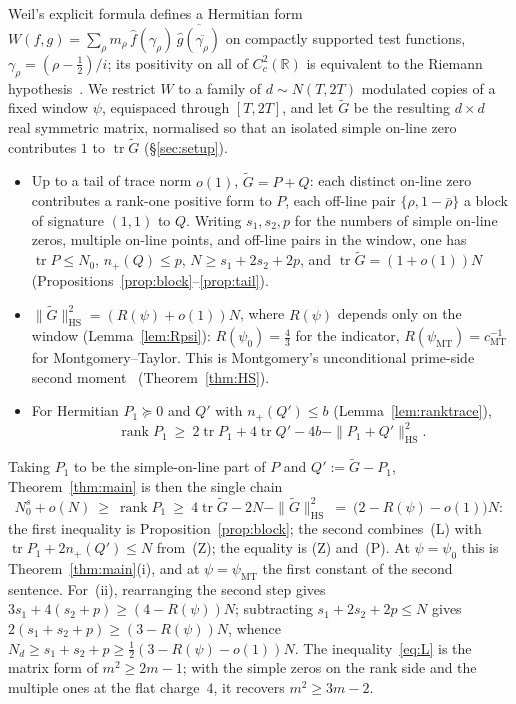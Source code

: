 \documentclass[11pt]{amsart}
\theoremstyle{definition}
\theoremstyle{remark}
\numberwithin{equation}{section}
\DeclareMathOperator{\tr}{tr}
\DeclareMathOperator{\rank}{rank}
\newcommand{\RR}{\mathbb{R}}
\newcommand{\wh}{\widehat}
\newcommand{\ol}{\overline}
\newcommand{\Gt}{\widetilde{G}}
\newcommand{\npl}{n_{+}}
\newcommand{\HS}{\mathrm{HS}}
\begin{document}
Weil's explicit formula defines a Hermitian form $W(f,g)=\sum_\rho m_\rho\,\wh f(\gamma_\rho)\,\ol{\wh g(\ol{\gamma_\rho})}$ on compactly supported test functions, $\gamma_\rho=(\rho-\tfrac12)/i$; its positivity on all of $C_c^2(\RR)$ is equivalent to the Riemann hypothesis~\cite{Wei52,Bom00}. We restrict $W$ to a family of $d\sim N(T,2T)$ modulated copies of a fixed window $\psi$, equispaced through $[T,2T]$, and let $\Gt$ be the resulting $d\times d$ real symmetric matrix, normalised so that an isolated simple on-line zero contributes $1$ to $\tr\Gt$ (\S\ref{sec:setup}).
\begin{itemize}
\item[(Z)] Up to a tail of trace norm $o(1)$, $\Gt=P+Q$: each distinct on-line zero contributes a rank-one positive form to $P$, each off-line pair $\{\rho,1-\bar\rho\}$ a block of signature $(1,1)$ to $Q$. Writing $s_1,s_2,p$ for the numbers of simple on-line zeros, multiple on-line points, and off-line pairs in the window, one has $\tr P\le N_0$, $\npl(Q)\le p$, $N\ge s_1+2s_2+2p$, and $\tr\Gt=(1+o(1))N$ (Propositions~\ref{prop:block}--\ref{prop:tail}).
\item[(P)] $\|\Gt\|_{\HS}^2=(R(\psi)+o(1))N$, where $R(\psi)$ depends only on the window (Lemma~\ref{lem:Rpsi}): $R(\psi_0)=\tfrac43$ for the indicator, $R(\psi_{\mathrm{MT}})=c_{\mathrm{MT}}^{-1}$ for Montgomery--Taylor. This is Montgomery's unconditional prime-side second moment~\cite{Mon73,Ary22,BGSTB24} (Theorem~\ref{thm:HS}).
\item[(L)] For Hermitian $P_1\succeq0$ and $Q'$ with $\npl(Q')\le b$ (Lemma~\ref{lem:ranktrace}),
\begin{equation}\label{eq:L}
\rank P_1\ \ge\ 2\tr P_1+4\tr Q'-4b-\|P_1+Q'\|_{\HS}^2.
\end{equation}
\end{itemize}
Taking $P_1$ to be the simple-on-line part of $P$ and $Q':=\Gt-P_1$, Theorem~\ref{thm:main} is then the single chain
\begin{equation}\label{eq:chain}
N_0^{s}+o(N)\ \ge\ \rank P_1\ \ge\ 4\tr\Gt-2N-\|\Gt\|_{\HS}^2\ =\ \bigl(2-R(\psi)-o(1)\bigr)N:
\end{equation}
the first inequality is Proposition~\ref{prop:block}; the second combines~(L) with $\tr P_1+2\npl(Q')\le N$ from~(Z); the equality is (Z) and~(P). At $\psi=\psi_0$ this is Theorem~\ref{thm:main}(i), and at $\psi=\psi_{\mathrm{MT}}$ the first constant of the second sentence. For~(ii), rearranging the second step gives $3s_1+4(s_2+p)\ge(4-R(\psi))N$; subtracting $s_1+2s_2+2p\le N$ gives $2(s_1+s_2+p)\ge(3-R(\psi))N$, whence $N_d\ge s_1+s_2+p\ge\tfrac12(3-R(\psi)-o(1))N$. The inequality~\eqref{eq:L} is the matrix form of $m^2\ge2m-1$; with the simple zeros on the rank side and the multiple ones at the flat charge~$4$, it recovers $m^2\ge3m-2$.
\end{document}
